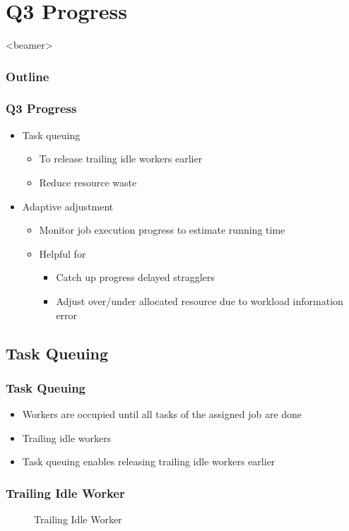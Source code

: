 \documentclass{beamer}
\begin{document}
\section{Q3 Progress}
\begin{frame}<beamer>
  \frametitle{Outline}
  \tableofcontents[
    currentsubsection,
    sectionstyle=show/shaded,
    subsectionstyle=show/show/shaded,
  ]
\end{frame}
\begin{frame}
  \frametitle{Q3 Progress}
  \begin{itemize}
    \item Task queuing
      \begin{itemize}
        \item To release trailing idle workers earlier
        \item Reduce resource waste
      \end{itemize}
    \item Adaptive adjustment
      \begin{itemize}
        \item Monitor job execution progress to estimate running time
        \item Helpful for
          \begin{itemize}
            \item Catch up progress delayed stragglers
            \item Adjust over/under allocated resource due to workload
              information error
          \end{itemize}
      \end{itemize}
  \end{itemize}
\end{frame}
\subsection{Task Queuing}
\begin{frame}
  \frametitle{Task Queuing}
  \begin{itemize}
    \item Workers are occupied until all tasks of the assigned job are
      done
    \item Trailing idle workers
    \item Task queuing enables releasing trailing idle workers earlier
  \end{itemize}
\end{frame}

\begin{frame}
  \frametitle{Trailing Idle Worker}

  \begin{figure}[h]
    \centering
    
    \caption{Trailing Idle Worker}
  \end{figure}

\end{frame}
\end{document}
